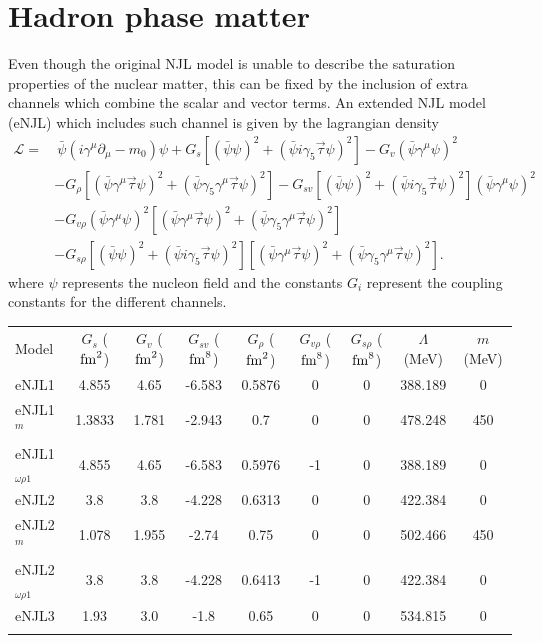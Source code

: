 \documentclass{ws-ijmpcs}
\begin{document}
\section{Hadron phase matter}

Even though the original NJL model is unable to describe the saturation properties of the nuclear matter, this can be fixed by the inclusion of extra channels which combine the scalar and vector terms\cite{Koch1987}. An extended NJL model (eNJL)\cite{Pais2016} which includes such channel is given by the lagrangian density
\begin{equation}\label{Eq:Lagrangiana_eNLJ_Pais}
\begin{split}
	\mathcal{L} =&~ \bar{\psi}(i\gamma^\mu\partial_\mu - m_0)\psi + G_s[(\bar{\psi}\psi)^2 + (\bar{\psi}i\gamma_5\vec{\tau}\psi)^2] - G_v(\bar{\psi}\gamma^\mu\psi)^2 \\
	& - G_\rho[(\bar{\psi}\gamma^\mu\vec{\tau}\psi)^2 + (\bar{\psi}\gamma_5\gamma^\mu\vec{\tau}\psi)^2] - G_{sv}[(\bar{\psi}\psi)^2 + (\bar{\psi}i\gamma_5\vec{\tau}\psi)^2](\bar{\psi}\gamma^\mu\psi)^2 \\
	& - G_{v\rho}(\bar{\psi}\gamma^\mu\psi)^2[(\bar{\psi}\gamma^\mu\vec{\tau}\psi)^2 + (\bar{\psi}\gamma_5\gamma^\mu\vec{\tau}\psi)^2] \\
	& - G_{s\rho} [(\bar{\psi}\psi)^2 + (\bar{\psi}i\gamma_5\vec{\tau}\psi)^2][(\bar{\psi}\gamma^\mu\vec{\tau}\psi)^2 + (\bar{\psi}\gamma_5\gamma^\mu\vec{\tau}\psi)^2].
\end{split}
\end{equation}
%
where $\psi$ represents the nucleon field and the constants $G_i$ represent the coupling constants for the different channels.
%
\begin{table}[!hb]
{\begin{tabular}{@{}lcccccccc@{}}\toprule
Model & $G_s$ ($\rm{fm}^2$) & $G_v$ ($\rm{fm}^2$) & $G_{sv}$ ($\rm{fm}^8$) & $G_\rho$ ($\rm{fm}^2$) & $G_{v\rho}$ ($\rm{fm}^8$) & $G_{s\rho}$ ($\rm{fm}^8$) & $\Lambda$ (MeV) & $m$ (MeV) \\ \colrule
eNJL1 & 4.855 & 4.65 & -6.583 & 0.5876 & 0 & 0 & 388.189 & 0 \\
eNJL1$^m$ & 1.3833 & 1.781 & -2.943 & 0.7 & 0 & 0 & 478.248 & 450 \\
eNJL1$_{\omega\rho 1}$ & 4.855 & 4.65 & -6.583 & 0.5976 & -1 & 0 & 388.189 & 0 \\
eNJL2 & 3.8 & 3.8 & -4.228 & 0.6313 & 0 & 0 & 422.384 & 0 \\
eNJL2$^m$ & 1.078 & 1.955 & -2.74 & 0.75 & 0 & 0 & 502.466 & 450 \\
eNJL2$_{\omega\rho 1}$ & 3.8 & 3.8 & -4.228 & 0.6413 & -1 & 0 & 422.384 & 0 \\
eNJL3 & 1.93 & 3.0 & -1.8 & 0.65 & 0 & 0 & 534.815 & 0 \\
\botrule
\end{tabular}\label{Tab:Parametros_eNJL}}
\end{table}
\end{document}
